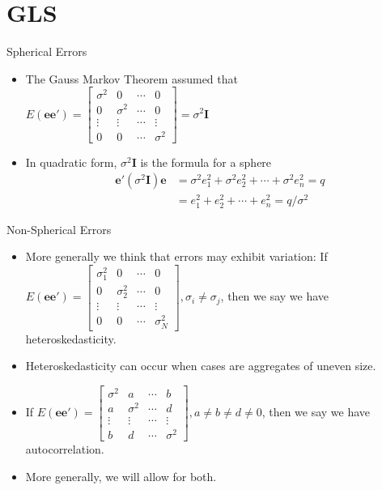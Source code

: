 \documentclass[aspectratio=169, handout]{beamer}
\numberwithin{equation}{section}
\begin{document}
\section{GLS}
\begin{frame}{Spherical Errors}
\begin{itemize}
\item The Gauss Markov Theorem assumed that $E(\bm{ee'})=\begin{bmatrix} \sigma^2 & 0 &\cdots & 0 \\ 0 & \sigma^2 & \cdots & 0  \\ \vdots & \vdots& \cdots& \vdots \\0 & 0& \cdots& \sigma^2 \end{bmatrix}=\sigma^2\bm{I}$
\item In quadratic form, $\sigma^2\bm{I}$ is the formula for a sphere
\begin{align*}
\bm{e'}(\sigma^2\bm{I})\bm{e}&=\sigma^2e_1^2+\sigma^2e_2^2+\cdots +\sigma^2e_n^2=q\\
&=e_1^2+e_2^2+\cdots +e_n^2=q/\sigma^2
\end{align*}
\end{itemize}
\end{frame}

\begin{frame}{Non-Spherical Errors}
\begin{itemize}
\item More generally we think that errors may exhibit variation: If $E(\bm{ee'})=\begin{bmatrix} \sigma_1^2 & 0 &\cdots & 0 \\ 0 & \sigma_2^2 & \cdots & 0  \\ \vdots & \vdots& \cdots& \vdots \\0 & 0& \cdots& \sigma_N^2 \end{bmatrix}, \sigma_i\neq \sigma_j$, then we say we have heteroskedasticity.
\item Heteroskedasticity can occur when cases are aggregates of uneven size.
\item If $E(\bm{ee'})=\begin{bmatrix} \sigma^2 & a &\cdots & b \\ a& \sigma^2 & \cdots & d  \\ \vdots & \vdots& \cdots& \vdots \\b & d& \cdots& \sigma^2 \end{bmatrix}, a\neq b\neq d \neq 0$, then we say we have autocorrelation.
\item More generally, we will allow for both.
\end{itemize}
\end{frame}
\end{document}
